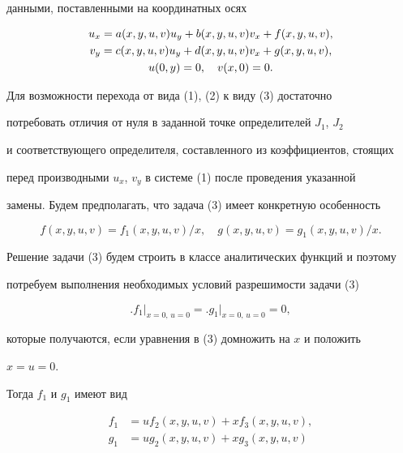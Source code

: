 данными, поставленными на координатных осях


\begin{gather}


u_x=a(x,y,u,v)u_y+b(x,y,u,v)v_x+f(x,y,u,v),\notag\\


v_y=c(x,y,u,v)u_y+d(x,y,u,v)v_x+g(x,y,u,v),\\


u(0,y)=0,\quad v(x,0)=0.\notag


\end{gather}





Для возможности перехода от вида (1), (2) к виду (3) достаточно


потребовать отличия от нуля в заданной точке определителей $J_1$, $J_2$


и соответствующего определителя, составленного из коэффициентов, стоящих


перед производными $u_x$, $v_y$ в системе (1) после проведения указанной


замены. Будем предполагать, что задача (3) имеет конкретную особенность


$$


f(x,y,u,v)=f_1(x,y,u,v)/x,\quad


g(x,y,u,v)=g_1(x,y,u,v)/x.


$$


Решение задачи (3) будем строить в классе аналитических функций и поэтому


потребуем выполнения необходимых условий разрешимости задачи (3)


\begin{equation}


\bigl. f_1\bigr|_{x=0,\,u=0}=


\bigl. g_1\bigr|_{x=0,\,u=0}=0,


\end{equation}


которые получаются, если уравнения в (3) домножить на $x$ и положить


$x=u=0$.


Тогда $f_1$ и $g_1$ имеют вид


\begin{align*}


f_1&=uf_2(x,y,u,v)+xf_3(x,y,u,v),\\


g_1&=ug_2(x,y,u,v)+xg_3(x,y,u,v)


\end{align*}


